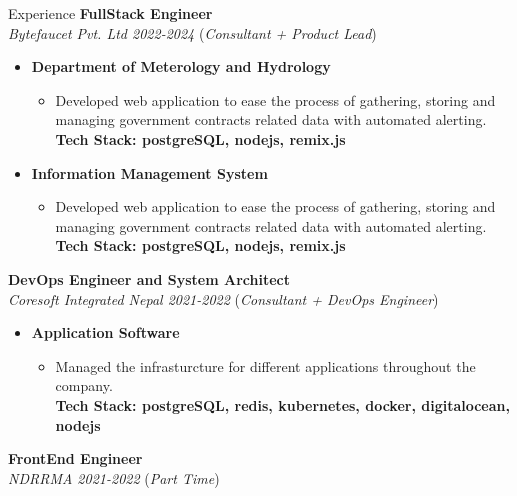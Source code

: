 \documentclass{resume} %
\begin{document}
\begin{rSection}{Experience}
    \large{{\bf FullStack Engineer}}
    \\ \small{\textit{Bytefaucet Pvt. Ltd 2022-2024}} (\small{\textit{Consultant + Product Lead}})

    \begin{itemize}
        \item \textbf{Department of Meterology and Hydrology}
              \begin{itemize}
                  \item Developed web application to ease the process of gathering, storing and managing government contracts related data with automated alerting.
                        \\ \footnotesize{\textbf{Tech Stack: postgreSQL, nodejs, remix.js }}
              \end{itemize}
        \item \textbf{Information Management System}
              \begin{itemize}
                  \item Developed web application to ease the process of gathering, storing and managing government contracts related data with automated alerting.
                        \\ \footnotesize{\textbf{Tech Stack: postgreSQL, nodejs, remix.js }}
              \end{itemize}

    \end{itemize}


    \large{{\bf DevOps Engineer and System Architect}}
    \\ \small{\textit{Coresoft Integrated Nepal 2021-2022}} (\small{\textit{Consultant + DevOps Engineer}})

    \begin{itemize}
        \item \textbf{Application Software}
              \begin{itemize}
                  \item Managed the infrasturcture for different applications throughout the company.
                        \\ \footnotesize{\textbf{Tech Stack: postgreSQL, redis, kubernetes, docker, digitalocean, nodejs }}
              \end{itemize}
    \end{itemize}


    \large{{\bf FrontEnd Engineer}}
    \\ \small{\textit{NDRRMA 2021-2022}} (\small{\textit{Part Time}})


\end{rSection}
\end{document}
